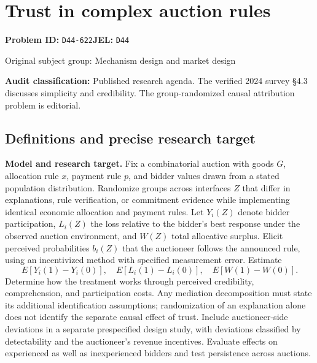 \documentclass[11pt,a4paper]{article}
\begin{document}
\section*{Trust in complex auction rules}
\textbf{Problem ID:} \texttt{D44-622}\quad \textbf{JEL:} \texttt{D44}\par
\label{problem:OP-0295}
{\sffamily\small\color{muted}Original subject group: Mechanism design and market design\par}
\label{definitions:problem:30007577}
\textbf{Audit classification:} Published research agenda. The verified 2024 survey §4.3 discusses simplicity and credibility. The group-randomized causal attribution problem is editorial.
\subsection*{Definitions and precise research target}
\textbf{Model and research target.} Fix a combinatorial auction with goods \(G\), allocation rule \(x\), payment rule \(p\), and bidder values drawn from a stated population distribution. Randomize groups across interfaces \(Z\) that differ in explanations, rule verification, or commitment evidence while implementing identical economic allocation and payment rules. Let \(Y_i(Z)\) denote bidder participation, \(L_i(Z)\) the loss relative to the bidder's best response under the observed auction environment, and \(W(Z)\) total allocative surplus. Elicit perceived probabilities \(b_i(Z)\) that the auctioneer follows the announced rule, using an incentivized method with specified measurement error. Estimate
\[
 E[Y_i(1)-Y_i(0)],\quad E[L_i(1)-L_i(0)],\quad E[W(1)-W(0)].
\]
Determine how the treatment works through perceived credibility, comprehension, and participation costs. Any mediation decomposition must state its additional identification assumptions; randomization of an explanation alone does not identify the separate causal effect of trust. Include auctioneer-side deviations in a separate prespecified design study, with deviations classified by detectability and the auctioneer's revenue incentives. Evaluate effects on experienced as well as inexperienced bidders and test persistence across auctions.
\end{document}
